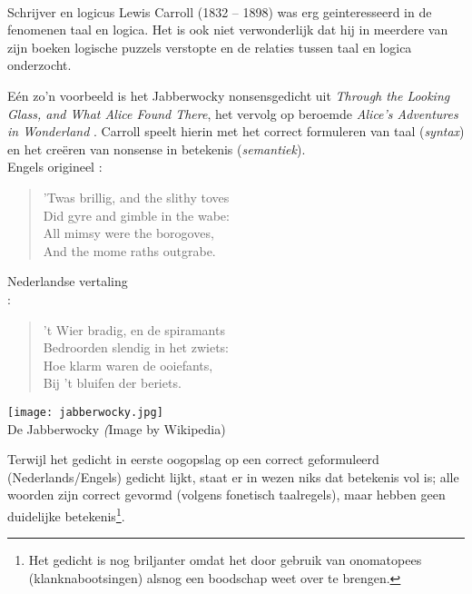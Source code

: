 \begin{aside}\mbox{}\\
Schrijver en logicus Lewis Carroll (1832 -- 1898) was erg geinteresseerd in de fenomenen taal en logica. Het is ook niet verwonderlijk dat hij in meerdere van zijn boeken logische puzzels verstopte en de relaties tussen taal en logica onderzocht.

E\'en zo'n voorbeeld is het Jabberwocky nonsensgedicht uit \textit{Through the Looking Glass, and What Alice Found There}, het vervolg op beroemde \textit{Alice's Adventures in Wonderland} \citep{carroll}. Carroll speelt hierin met het correct formuleren van taal (\emph{syntax}) en het cre\"eren van nonsense in betekenis (\emph{semantiek}). \\[2.5pt]

Engels origineel \citep{carroll}:
\begin{quote}
    'Twas brillig, and the slithy toves\\
    Did gyre and gimble in the wabe:\\
    All mimsy were the borogoves,\\
    And the mome raths outgrabe.
\end{quote}
Nederlandse vertaling\\ \citep{wauwelwok}:
\begin{quote}
    't Wier bradig, en de spiramants\\
	Bedroorden slendig in het zwiets:\\
	Hoe klarm waren de ooiefants,\\
	Bij 't bluifen der beriets.\\
\end{quote}

  \begin{marginfigure}
\texttt{[image: jabberwocky.jpg]}\\
   De Jabberwocky {\scriptsize\emph (Image by Wikipedia)}\\[3mm]
  \end{marginfigure}

Terwijl het gedicht in eerste oogopslag op een correct geformuleerd (Nederlands/Engels) gedicht lijkt, staat er in wezen niks dat betekenis vol is; alle woorden zijn correct gevormd (volgens fonetisch taalregels), maar hebben geen duidelijke betekenis\footnote{Het gedicht is nog briljanter omdat het door gebruik van onomatopees (klanknabootsingen) alsnog een boodschap weet over te brengen.}.
\end{aside}

